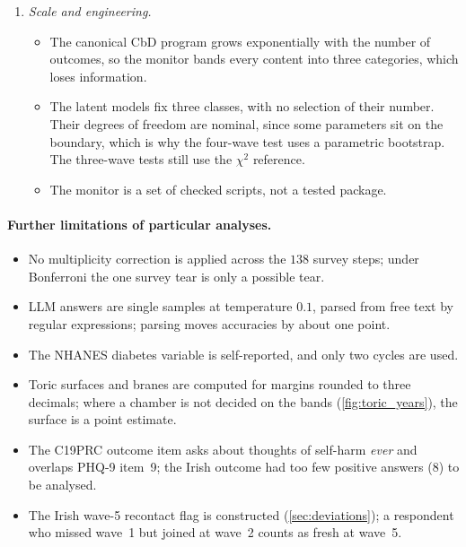 \documentclass[11pt]{article}
\theoremstyle{definition}
\theoremstyle{remark}
\begin{document}
\begin{enumerate}[leftmargin=*]
\begin{itemize}[nosep]
    seeing the result, so it must be pre-registered and replicated before it counts.
  \item The tower's posterior over toric surfaces ignores the sampling uncertainty of the realized margins. It was certain of a surface
    that the data's own bands leave undecided. Remedy: propagate the bands of the predicted and observed margins into the surface posterior.
  \end{itemize}
\item \emph{Scale and engineering.}
  \begin{itemize}[nosep]
  \item The canonical CbD program grows exponentially with the number of outcomes, so the monitor bands every content into three
    categories, which loses information.
  \item The latent models fix three classes, with no selection of their number. Their degrees of freedom are nominal, since some
    parameters sit on the boundary, which is why the four-wave test uses a parametric bootstrap. The three-wave tests still use the
    $\chi^2$ reference.
  \item The monitor is a set of checked scripts, not a tested package.
  \end{itemize}
\end{enumerate}

\paragraph{Further limitations of particular analyses.}
\begin{itemize}[leftmargin=*,nosep]
\item No multiplicity correction is applied across the $138$ survey steps; under Bonferroni the one survey tear is only a possible tear.
\item LLM answers are single samples at temperature $0.1$, parsed from free text by regular expressions; parsing moves accuracies by about
  one point.
\item The NHANES diabetes variable is self-reported, and only two cycles are used.
\item Toric surfaces and branes are computed for margins rounded to three decimals; where a chamber is not decided on the bands
  (\cref{fig:toric_years}), the surface is a point estimate.
\item The C19PRC outcome item asks about thoughts of self-harm \emph{ever} and overlaps PHQ-9 item~9; the Irish outcome had too few
  positive answers ($8$) to be analysed.
\item The Irish wave-5 recontact flag is constructed (\cref{sec:deviations}); a respondent who missed wave~1 but joined at wave~2 counts
  as fresh at wave~5.
\end{itemize}
\end{document}
